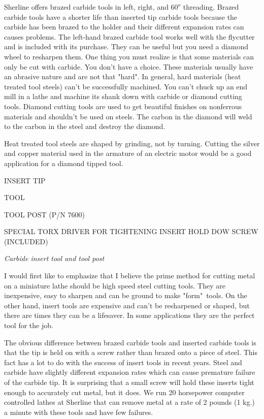 Sherline offers brazed carbide tools in left, right, and $60^o$ threading.
Brazed carbide tools have a shorter life than inserted tip carbide tools because
the carbide has been brazed to the holder and their different expansion rates
can causes problems. The left-hand brazed carbide tool works well with the
flycutter and is included with its purchase. They can be useful but you need a
diamond wheel to resharpen them. One thing you must realize is that some
materials can only be cut with carbide. You don't have a choice. These materials
usually have an abrasive nature and are not that "hard". In general, hard
materials (heat treated tool steels) can't be successfully machined. You can't
chuck up an end mill in a lathe and machine its shank down with carbide or
diamond cutting tools. Diamond cutting tools are used to get beautiful finishes
on nonferrous materials and shouldn't be used on steels. The carbon in the
diamond will weld to the carbon in the steel and destroy the diamond.

Heat treated tool steels are shaped by grinding, not by turning. Cutting the
silver and copper material used in the armature of an electric motor would be a
good application for a diamond tipped tool.

\bigskip
INSERT TIP

TOOL

TOOL POST (P/N 7600)

SPECIAL TORX DRIVER FOR TIGHTENING INSERT HOLD DOW SCREW (INCLUDED)
\bigskip

\textit{Carbide insert tool and tool post}
\bigskip


I would first like to emphasize that I believe the prime method for cutting
metal on a miniature lathe should be high speed steel cutting tools. They are
inexpensive, easy to sharpen and can be ground to make "form"\ tools. On the
other hand, insert tools are expensive and can't be resharpened or shaped, but
there are times they can be a lifesaver. In some applications they are the
perfect tool for the job.

The obvious difference between brazed carbide tools and inserted carbide tools
is that the tip is held on with a screw rather than brazed onto a piece of
steel. This fact has a lot to do with the success of insert tools in recent
years. Steel and carbide have slightly different expansion rates which can cause
premature failure of the carbide tip. It is surprising that a small screw will
hold these inserts tight enough to accurately cut metal, but it does. We run 20
horsepower computer controlled lathes at Sherline that can remove metal at a
rate of 2 pounds (1 kg.) a minute with these tools and have few failures.

